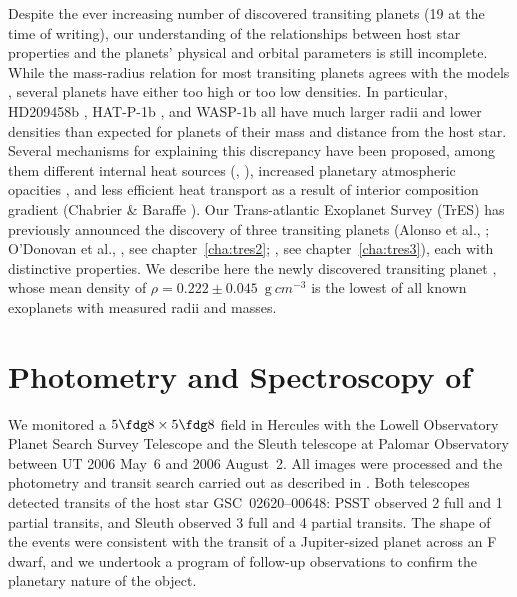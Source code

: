 Despite the ever increasing number of discovered transiting planets (19 at the
time of writing), our understanding of the relationships between host star
properties and the planets' physical and orbital parameters is still
incomplete.
While the mass-radius relation
for most transiting planets agrees with the models \citep{Charbonneau_Brown_Burrows:PPV:2007a}, several
planets have either too high or too low densities. In particular, HD209458b
\citep{Knutson_Charbonneau_Noyes:apj:2007a}, HAT-P-1b \citep{Bakos_Noyes_Kovacs:apj:2007a}, and WASP-1b \citep{Collier-Cameron_Bouchy_Hebrard:MNRAS:2007a} all have
much larger radii and lower densities than expected for planets of their
mass and distance from the host star. Several mechanisms for explaining this
discrepancy have been proposed, among them different internal heat sources
(\citealp{Guillot_Showman:aa:2002a}, \citealp*{Bodenheimer_Laughlin_Lin:apj:2003a}), increased planetary atmospheric opacities
\citep{Burrows_Hubeny_Budaj:apj:2007a}, and less efficient heat transport as a result of interior composition gradient (Chabrier \& Baraffe \citeyear{Chabrier_Baraffe:apjl:2007a}).
Our Trans-atlantic Exoplanet Survey (TrES) has previously announced the
discovery of three transiting planets (Alonso et al., \citeyear{Alonso_Brown_Torres:apjl:2004a};  O'Donovan et al., \citeyear{ODonovan_Charbonneau_Mandushev:apjl:2006a}, see chapter~\ref{cha:tres2}; \citealp{ODonovan_Charbonneau_Bakos:apjl:2007a}, see chapter~\ref{cha:tres3}), each with distinctive properties. We describe here the newly discovered transiting planet \tresFour, whose mean density of $\rho = 0.222 \pm 0.045$~${\mathrm g \: cm^{-3}}$ is the lowest of all known exoplanets with measured radii and masses.

\section{Photometry and Spectroscopy of \tresFour}\label{cha:tres4:sec:obs}

We monitored a $5\fdg8 \times 5\fdg8$ field in Hercules with the Lowell
Observatory Planet Search Survey Telescope \citep[PSST, ][]{Dunham_Mandushev_Taylor:pasp:2004a} and the
Sleuth telescope \citep{ODonovan_Charbonneau_Kotredes:AIP:2004a} at Palomar Observatory between UT 2006 May~6 and 2006 August~2.
All images were
processed and the photometry and transit search carried out as described in
\citet{Dunham_Mandushev_Taylor:pasp:2004a}.
Both telescopes detected transits of the host star
GSC~02620--00648: PSST observed 2 full and 1 partial transits, and Sleuth
observed 3 full and 4 partial transits. The shape of the events
were consistent with the transit of a Jupiter-sized planet across an F dwarf,
and we undertook a program of follow-up observations to confirm the planetary
nature of the object.

